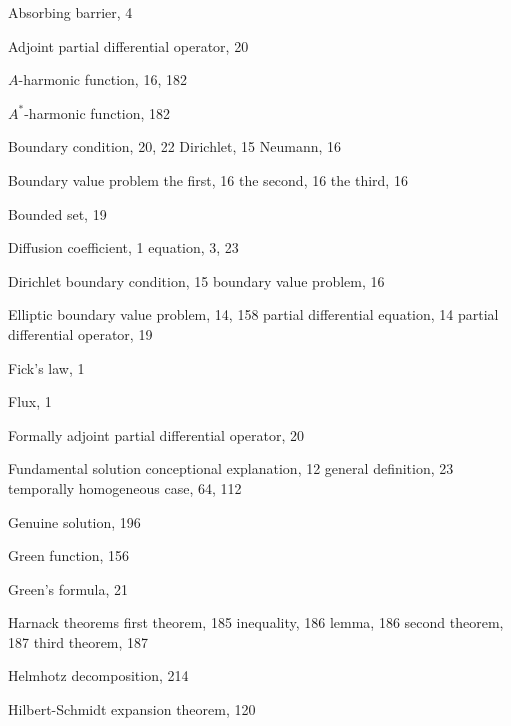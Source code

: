 \begin{theindex}

\item Absorbing barrier, 4
\item Adjoint partial differential operator, 20
\item $A$-harmonic function, 16, 182
\item $A^*$-harmonic function, 182

\indexspace

\item Boundary condition, 20, 22
\subitem Dirichlet, 15
\subitem Neumann, 16
\item Boundary value problem
\subitem the first, 16
\subitem the second, 16
\subitem the third, 16
\item Bounded set, 19

\indexspace

\item Diffusion
\subitem coefficient, 1 
\subitem equation, 3, 23
\item Dirichlet
\subitem boundary condition, 15
\subitem boundary value problem, 16

\indexspace

\item Elliptic
\subitem boundary value problem, 14, 158
\subitem partial differential equation, 14
\subitem partial differential operator, 19

\indexspace

\item Fick's law, 1
\item Flux, 1
\item Formally adjoint partial differential operator, 20
\item Fundamental solution
\subitem conceptional explanation, 12
\subitem general definition, 23
\subitem temporally homogeneous case, 64, 112

\indexspace

\item Genuine solution, 196
\item Green function, 156
\item Green's formula, 21

\indexspace

\item Harnack theorems
\subitem first theorem, 185
\subitem inequality, 186
\subitem lemma, 186
\subitem second theorem, 187
\subitem third theorem, 187
\item Helmhotz decomposition, 214
\item Hilbert-Schmidt expansion theorem, 120


\end{theindex}
